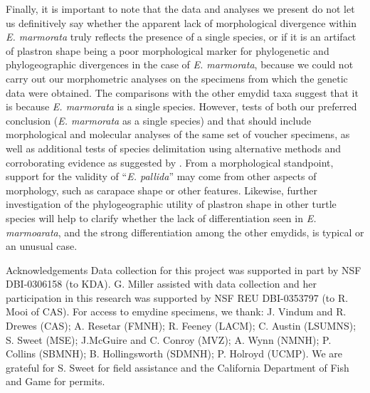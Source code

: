 \documentclass[12pt,letterpaper]{article}
\renewcommand{\section}[1]{%
\bigskip
\begin{center}
\begin{Large}
\normalfont\scshape #1
\medskip
\end{Large}
\end{center}}
\begin{document}
Finally, it is important to note that the data and analyses we present do not let us definitively say whether the apparent lack of morphological divergence within \textit{E. marmorata} truly reflects the presence of a single species, or if it is an artifact of plastron shape being a poor morphological marker for phylogenetic and phylogeographic divergences in the case of \textit{E. marmorata}, because we could not carry out our morphometric analyses on the specimens from which the genetic data were obtained. The comparisons with the other emydid taxa suggest that it is because \textit{E. marmorata} is a single species. However, tests of both our preferred conclusion (\textit{E. marmorata} as a single species) and that \citet{Spinks2014} should include morphological and molecular analyses of the same set of voucher specimens, as well as additional tests of species delimitation using alternative methods and corroborating evidence as suggested by \citet{Carstens2013}. From a morphological standpoint, support for the validity of ``\textit{E. pallida}'' may come from other aspects of morphology, such as carapace shape or other features. Likewise, further investigation of the phylogeographic utility of plastron shape in other turtle species will help to clarify whether the lack of differentiation seen in \textit{E. marmoarata}, and the strong differentiation among the other emydids, is typical or an unusual case.


\section*{Acknowledgements}
Data collection for this project was supported in part by NSF DBI-0306158 (to KDA). G. Miller assisted with data collection and her participation in this research was supported by NSF REU DBI-0353797 (to R. Mooi of CAS). For access to emydine specimens, we thank: J. Vindum and R. Drewes (CAS); A. Resetar (FMNH); R. Feeney (LACM); C. Austin (LSUMNS); S. Sweet (MSE); J.McGuire and C. Conroy (MVZ); A. Wynn (NMNH); P. Collins (SBMNH); B. Hollingsworth (SDMNH); P. Holroyd (UCMP). We are grateful for S. Sweet for field assistance and the California Department of Fish and Game for permits.
\end{document}
